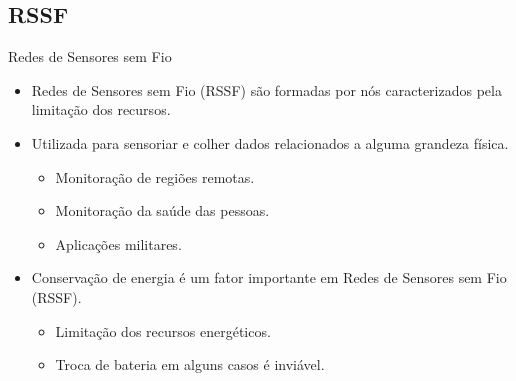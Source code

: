 \documentclass{beamer}
\begin{document}
\subsection{RSSF}
\begin{frame}{Redes de Sensores sem Fio}
  \begin{itemize}
    \item
      Redes de Sensores sem Fio (RSSF) são formadas por nós caracterizados pela limitação dos recursos.
    \item
      Utilizada para sensoriar e colher dados relacionados a alguma grandeza física.
      \begin{itemize}
       \item Monitoração de regiões remotas.
	\item Monitoração da saúde das pessoas.
	\item Aplicações militares.
      \end{itemize}
  \item
    Conservação de energia é um fator importante em Redes de Sensores sem Fio (RSSF).
    \begin{itemize}
    	\item
    		Limitação dos recursos energéticos.
    	\item
    		Troca de bateria em alguns casos é inviável.
    \end{itemize}
  \end{itemize}
\end{frame}
\end{document}
